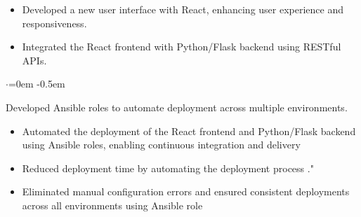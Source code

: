\documentclass{article}
\begin{document}
\vspace{-1.6em}
\begin{itemize}
    \item Developed a new user interface with React, enhancing user experience and responsiveness.
    \item Integrated the React frontend with  Python/Flask backend using RESTful APIs.
\end{itemize}

\begin{list}{$\cdot$}{\leftmargin=0em} %
    \itemsep -0.5em \vspace{-0.5em} %
    \item Developed Ansible roles to automate deployment across multiple environments.
\end{list}

\vspace{-1.6em}
\begin{itemize}
    \item  Automated the deployment of the React frontend and Python/Flask backend using Ansible roles, enabling continuous integration and delivery
    \item Reduced deployment time by  automating the deployment process  ."
    \item Eliminated manual configuration errors and ensured consistent deployments across all environments using Ansible role  

\end{itemize}
\end{document}
